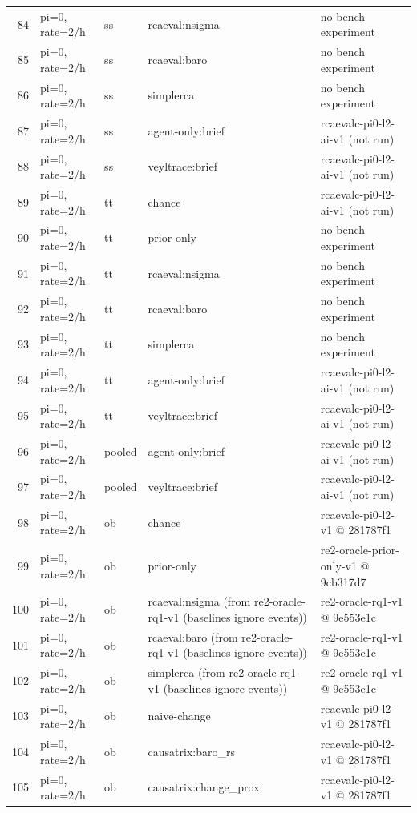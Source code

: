 \begin{longtable}{@{}r>{\raggedright\arraybackslash}p{48.0pt}>{\raggedright\arraybackslash}p{18.0pt}>{\raggedright\arraybackslash}p{108.0pt}>{\raggedright\arraybackslash}p{105.0pt}@{}}
84 & pi=0, rate=2/h & ss & rcaeval:nsigma & no bench experiment \\
85 & pi=0, rate=2/h & ss & rcaeval:baro & no bench experiment \\
86 & pi=0, rate=2/h & ss & simplerca & no bench experiment \\
87 & pi=0, rate=2/h & ss & agent-only:brief & rcaevalc-pi0-l2-ai-v1 (not run) \\
88 & pi=0, rate=2/h & ss & veyltrace:brief & rcaevalc-pi0-l2-ai-v1 (not run) \\
89 & pi=0, rate=2/h & tt & chance & rcaevalc-pi0-l2-ai-v1 (not run) \\
90 & pi=0, rate=2/h & tt & prior-only & no bench experiment \\
91 & pi=0, rate=2/h & tt & rcaeval:nsigma & no bench experiment \\
92 & pi=0, rate=2/h & tt & rcaeval:baro & no bench experiment \\
93 & pi=0, rate=2/h & tt & simplerca & no bench experiment \\
94 & pi=0, rate=2/h & tt & agent-only:brief & rcaevalc-pi0-l2-ai-v1 (not run) \\
95 & pi=0, rate=2/h & tt & veyltrace:brief & rcaevalc-pi0-l2-ai-v1 (not run) \\
96 & pi=0, rate=2/h & pooled & agent-only:brief & rcaevalc-pi0-l2-ai-v1 (not run) \\
97 & pi=0, rate=2/h & pooled & veyltrace:brief & rcaevalc-pi0-l2-ai-v1 (not run) \\
98 & pi=0, rate=2/h & ob & chance & rcaevalc-pi0-l2-v1 @ 281787f1 \\
99 & pi=0, rate=2/h & ob & prior-only & re2-oracle-prior-only-v1 @ 9cb317d7 \\
100 & pi=0, rate=2/h & ob & rcaeval:nsigma (from re2-oracle-rq1-v1 (baselines ignore events)) & re2-oracle-rq1-v1 @ 9e553e1c \\
101 & pi=0, rate=2/h & ob & rcaeval:baro (from re2-oracle-rq1-v1 (baselines ignore events)) & re2-oracle-rq1-v1 @ 9e553e1c \\
102 & pi=0, rate=2/h & ob & simplerca (from re2-oracle-rq1-v1 (baselines ignore events)) & re2-oracle-rq1-v1 @ 9e553e1c \\
103 & pi=0, rate=2/h & ob & naive-change & rcaevalc-pi0-l2-v1 @ 281787f1 \\
104 & pi=0, rate=2/h & ob & causatrix:baro\_rs & rcaevalc-pi0-l2-v1 @ 281787f1 \\
105 & pi=0, rate=2/h & ob & causatrix:change\_prox & rcaevalc-pi0-l2-v1 @ 281787f1 \\

\end{longtable}
